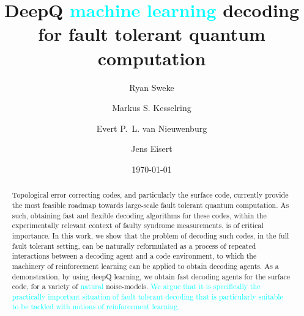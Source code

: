 \documentclass[twocolumn,preprintnumbers,amsmath,amssymb,notitlepage,nofootinbib,longbibliography,superscriptaddress,aps,pra,10pt]{revtex4-1}
\newcommand{\je}[1]{\textcolor{cyan}{#1}}
\begin{document}
	\title{DeepQ \je{machine learning} decoding for fault tolerant quantum computation}

	\author{Ryan Sweke}
	\author{Markus S. Kesselring}
	\author{Evert P.~L. van Nieuwenburg}
	\author{Jens Eisert}


	\date{\today}

	\begin{abstract}
		Topological error correcting codes, and particularly the surface code, currently provide the most feasible 
		roadmap towards large-scale fault tolerant quantum computation.
		As such, obtaining fast and flexible decoding algorithms for these codes, within the experimentally relevant context 
		of faulty syndrome measurements, is of critical importance.
		In this work, we show that the problem of decoding such codes, in the full fault tolerant setting, can be naturally reformulated as a process of 
		repeated interactions between a decoding agent and a code environment, to which the machinery of reinforcement learning 
		can be applied to obtain decoding agents.
		As a demonstration, by using deepQ learning, we obtain fast decoding agents for the surface code, for a variety of 
		\je{natural} noise-models.
		 \je{We argue that it is specifically the practically important situation of fault tolerant decoding that is particularly suitable
		 to be tackled with notions of reinforcement learning.}
	\end{abstract}

\maketitle
\end{document}
